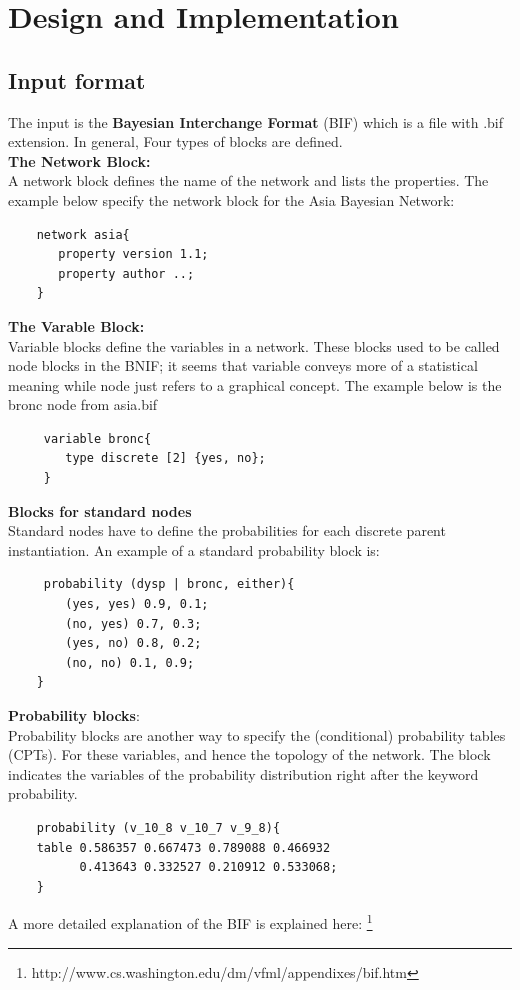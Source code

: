 \newpage
\section{Design and Implementation}
    \subsection{Input format}
    The input is the \textbf{Bayesian Interchange Format} (BIF) which is a file with .bif extension.
    In general, Four types of blocks are defined.\\
    \noindent \textbf{The Network Block:}\\
    A network block defines the name of the network and lists the properties. The example below specify the network block for the Asia Bayesian Network:
    \begin{lstlisting}
    network asia{
       property version 1.1;
       property author ..;
    }
    \end{lstlisting}
    
    \noindent \textbf{The Varable Block:}\\
    Variable blocks define the variables in a network. These blocks used
    to be called node blocks in the BNIF; it seems that variable conveys
    more of a statistical meaning while node just refers to a graphical
    concept. The example below is the bronc node from asia.bif
    \begin{lstlisting}
     variable bronc{
        type discrete [2] {yes, no};
     }
    \end{lstlisting}
    
    \noindent \textbf{Blocks for standard nodes}\\
    Standard nodes have to define the probabilities for each discrete parent instantiation. An example of a standard probability block is: 
    \begin{lstlisting}
     probability (dysp | bronc, either){
        (yes, yes) 0.9, 0.1;
        (no, yes) 0.7, 0.3;
        (yes, no) 0.8, 0.2;
        (no, no) 0.1, 0.9;
    }
    \end{lstlisting}
    
    \noindent \textbf{Probability blocks}:\\
    Probability blocks are another way to specify the (conditional) probability tables (CPTs). For these variables, and hence the topology of the network. The block indicates the variables of the probability distribution right after the keyword probability.
    \begin{lstlisting}
    probability (v_10_8 v_10_7 v_9_8){ 
	table 0.586357 0.667473 0.789088 0.466932 
	      0.413643 0.332527 0.210912 0.533068;
    }
    \end{lstlisting}
    A more detailed explanation of the BIF is explained here: \footnote{http://www.cs.washington.edu/dm/vfml/appendixes/bif.htm} \\
    
